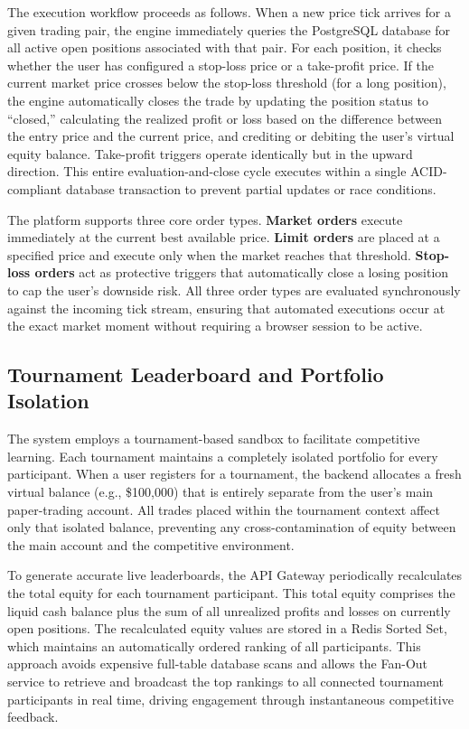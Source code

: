 \documentclass[conference]{IEEEtran}
\begin{document}
The execution workflow proceeds as follows. When a new price tick arrives for a given trading pair, the engine immediately queries the PostgreSQL database for all active open positions associated with that pair. For each position, it checks whether the user has configured a stop-loss price or a take-profit price. If the current market price crosses below the stop-loss threshold (for a long position), the engine automatically closes the trade by updating the position status to ``closed,'' calculating the realized profit or loss based on the difference between the entry price and the current price, and crediting or debiting the user's virtual equity balance. Take-profit triggers operate identically but in the upward direction. This entire evaluation-and-close cycle executes within a single ACID-compliant database transaction to prevent partial updates or race conditions.

The platform supports three core order types. \textbf{Market orders} execute immediately at the current best available price. \textbf{Limit orders} are placed at a specified price and execute only when the market reaches that threshold. \textbf{Stop-loss orders} act as protective triggers that automatically close a losing position to cap the user's downside risk. All three order types are evaluated synchronously against the incoming tick stream, ensuring that automated executions occur at the exact market moment without requiring a browser session to be active.

\subsection{Tournament Leaderboard and Portfolio Isolation}
The system employs a tournament-based sandbox to facilitate competitive learning. Each tournament maintains a completely isolated portfolio for every participant. When a user registers for a tournament, the backend allocates a fresh virtual balance (e.g., \$100,000) that is entirely separate from the user's main paper-trading account. All trades placed within the tournament context affect only that isolated balance, preventing any cross-contamination of equity between the main account and the competitive environment.

To generate accurate live leaderboards, the API Gateway periodically recalculates the total equity for each tournament participant. This total equity comprises the liquid cash balance plus the sum of all unrealized profits and losses on currently open positions. The recalculated equity values are stored in a Redis Sorted Set, which maintains an automatically ordered ranking of all participants. This approach avoids expensive full-table database scans and allows the Fan-Out service to retrieve and broadcast the top rankings to all connected tournament participants in real time, driving engagement through instantaneous competitive feedback.
\end{document}
